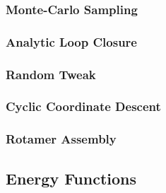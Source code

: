 \subsubsection{Monte-Carlo Sampling}
\label{subsubsection:monte_carlo}


\subsubsection{Analytic Loop Closure}
\label{subsubsection:analytic_loop_closure}


\subsubsection{Random Tweak}
\label{subsubsection:tweak}


\subsubsection{Cyclic Coordinate Descent}
\label{subsubsection:cyclic_coordinate_descent}


\subsubsection{Rotamer Assembly}
\label{subsubsection:rotamer_assembly}


\subsection{Energy Functions}
\label{subsection:energy_functions}



